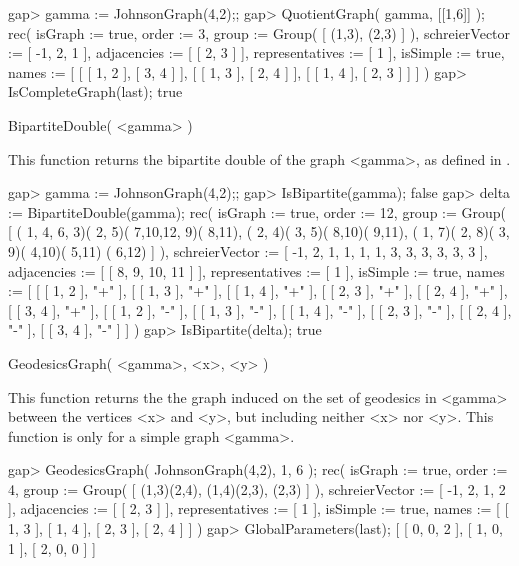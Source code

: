 \beginexample
gap> gamma := JohnsonGraph(4,2);;
gap> QuotientGraph( gamma, [[1,6]] );
rec(
  isGraph := true,
  order := 3,
  group := Group( [ (1,3), (2,3) ] ),
  schreierVector := [ -1, 2, 1 ],
  adjacencies := [ [ 2, 3 ] ],
  representatives := [ 1 ],
  isSimple := true,
  names := [ [ [ 1, 2 ], [ 3, 4 ] ], [ [ 1, 3 ], [ 2, 4 ] ],
      [ [ 1, 4 ], [ 2, 3 ] ] ] )
gap> IsCompleteGraph(last);
true
\endexample


\>BipartiteDouble( <gamma> )

This function  returns the  bipartite  double  of the graph  <gamma>,  as
defined in \cite{BCN89}.

\beginexample
gap> gamma := JohnsonGraph(4,2);;
gap> IsBipartite(gamma);
false
gap> delta := BipartiteDouble(gamma);
rec(
  isGraph := true,
  order := 12,
  group := Group( [ ( 1, 4, 6, 3)( 2, 5)( 7,10,12, 9)( 8,11),
      ( 2, 4)( 3, 5)( 8,10)( 9,11), ( 1, 7)( 2, 8)( 3, 9)( 4,10)( 5,11)
        ( 6,12) ] ),
  schreierVector := [ -1, 2, 1, 1, 1, 1, 3, 3, 3, 3, 3, 3 ],
  adjacencies := [ [ 8, 9, 10, 11 ] ],
  representatives := [ 1 ],
  isSimple := true,
  names := [ [ [ 1, 2 ], "+" ], [ [ 1, 3 ], "+" ], [ [ 1, 4 ], "+" ],
      [ [ 2, 3 ], "+" ], [ [ 2, 4 ], "+" ], [ [ 3, 4 ], "+" ],
      [ [ 1, 2 ], "-" ], [ [ 1, 3 ], "-" ], [ [ 1, 4 ], "-" ],
      [ [ 2, 3 ], "-" ], [ [ 2, 4 ], "-" ], [ [ 3, 4 ], "-" ] ] )
gap> IsBipartite(delta);
true
\endexample


\>GeodesicsGraph( <gamma>, <x>, <y> )

This function returns the the graph induced on the set of geodesics
in <gamma> between the vertices <x> and <y>, but including neither <x>
nor <y>. This function is only for a simple graph <gamma>.

\beginexample
gap> GeodesicsGraph( JohnsonGraph(4,2), 1, 6 );
rec(
  isGraph := true,
  order := 4,
  group := Group( [ (1,3)(2,4), (1,4)(2,3), (2,3) ] ),
  schreierVector := [ -1, 2, 1, 2 ],
  adjacencies := [ [ 2, 3 ] ],
  representatives := [ 1 ],
  isSimple := true,
  names := [ [ 1, 3 ], [ 1, 4 ], [ 2, 3 ], [ 2, 4 ] ] )
gap> GlobalParameters(last);
[ [ 0, 0, 2 ], [ 1, 0, 1 ], [ 2, 0, 0 ] ]
\endexample


